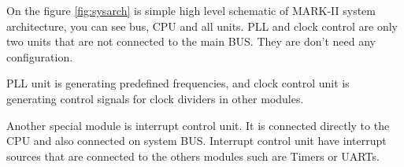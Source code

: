 On the figure \ref{fig:sysarch} is simple high level schematic of MARK-II system architecture,
you can see bus, CPU and all units. PLL and clock control are only two units
that are not connected to the main BUS. They are don't need any configuration.

PLL unit is generating predefined frequencies, and clock control unit is
generating control signals for clock dividers in other modules.

Another special module is interrupt control unit. It is connected directly to
the CPU and also connected on system BUS. Interrupt control unit have interrupt
sources that are connected to the others modules such are Timers or UARTs.
